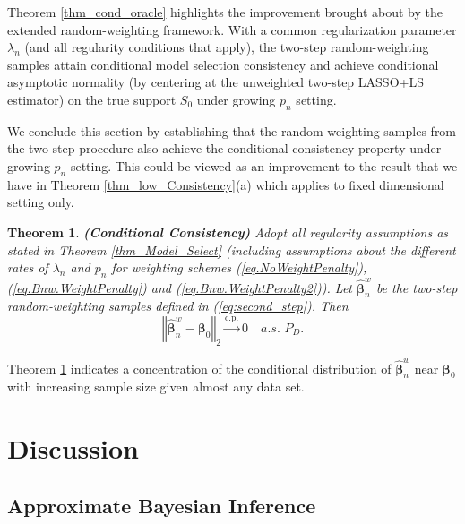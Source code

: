 \documentclass[ejs,authoryear,linksfromyear]{imsart}
\newcommand{\CONV}[1]{\stackrel{\text{#1}}{\longrightarrow}} %
\newcommand{\bnw}{\widehat{\bm{\beta}}_n^w} %
\numberwithin{equation}{section}
\theoremstyle{plain}
\newtheorem{thm}{Theorem}[section]
\begin{document}
Theorem \ref{thm_cond_oracle} highlights the improvement brought about by the extended random-weighting framework. With a common regularization parameter $\lambda_n$ (and all regularity conditions that apply), the two-step random-weighting samples  attain conditional model selection consistency and achieve conditional asymptotic normality (by centering at the unweighted two-step LASSO+LS estimator) on the true support $S_0$ under growing $p_n$ setting.   

We conclude this section by establishing that the random-weighting samples from the two-step procedure also achieve the conditional consistency property under growing $p_n$ setting. This could be viewed as an improvement to the result that we have in Theorem \ref{thm_low_Consistency}(a) which applies to fixed dimensional setting only. 

\begin{thm} \label{thm_high_Consistency}
	\textbf{(Conditional Consistency)} Adopt all regularity assumptions as stated in Theorem \ref{thm_Model_Select} (including assumptions about the different rates of $\lambda_n$ and $p_n$ for weighting schemes (\ref{eq.NoWeightPenalty}), (\ref{eq.Bnw.WeightPenalty}) and (\ref{eq.Bnw.WeightPenalty2})). Let $\bnw$ be the two-step random-weighting samples defined in (\ref{eq:second_step}). Then
	$$
	\left\Vert 
		\bnw - \bm{\beta}_0 
	\right\Vert_2
	\CONV{c.p.} 0
	\quad a.s. \,\, P_D. 
	$$  
\end{thm}

Theorem \ref{thm_high_Consistency} indicates a concentration of the conditional distribution of $\bnw$ near $\bm{\beta}_0$ with increasing sample size  given almost any data set. 

\section{Discussion} \label{sec:discuss}

\subsection{Approximate Bayesian Inference}
\end{document}
